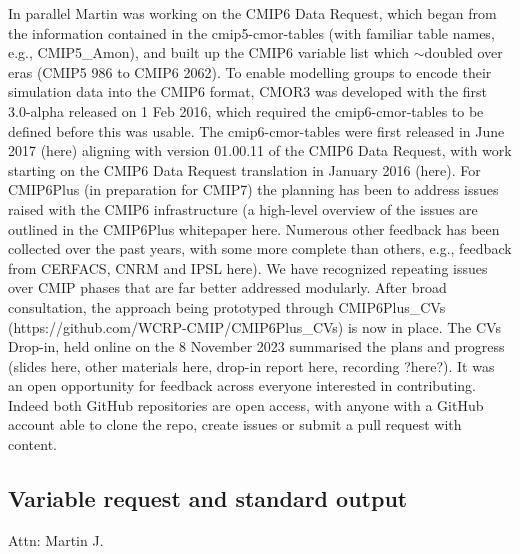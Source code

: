 \documentclass[gmd, preprint]{copernicus}
\newcommand{\mycomment}[1]{}
\def\cred#1{{\color{red}#1}}
\begin{document}
{In parallel Martin was working on the CMIP6 Data Request, which began from the information contained in the cmip5-cmor-tables (with familiar table names, e.g., CMIP5_Amon), and built up the CMIP6 variable list which $\sim$doubled over eras (CMIP5 986 to CMIP6 2062). To enable modelling groups to encode their simulation data into the CMIP6 format, CMOR3 was developed with the first 3.0-alpha released on 1 Feb 2016, which required the cmip6-cmor-tables to be defined before this was usable. The cmip6-cmor-tables were first released in June 2017 (here) aligning with version 01.00.11 of the CMIP6 Data Request, with work starting on the CMIP6 Data Request translation in January 2016 (here).
For CMIP6Plus (in preparation for CMIP7) the planning has been to address issues raised with the CMIP6 infrastructure (a high-level overview of the issues are outlined in the CMIP6Plus whitepaper here. Numerous other feedback has been collected over the past years, with some more complete than others, e.g., feedback from CERFACS, CNRM and IPSL here). We have recognized repeating issues over CMIP phases that are far better addressed modularly. After broad consultation, the approach being prototyped through CMIP6Plus_CVs (https://github.com/WCRP-CMIP/CMIP6Plus_CVs) is now in place. The CVs Drop-in, held online on the 8 November 2023 summarised the plans and progress (slides here, other materials here, drop-in report here, recording ?here?). It was an open opportunity for feedback across everyone interested in contributing. Indeed both GitHub repositories are open access, with anyone with a GitHub account able to clone the repo, create issues or submit a pull request with content.
}


\subsection{Variable request and standard output}
\label{sec:CMIP6DR}
\cred{Attn: Martin J.}
\mycomment{Consider realm/frequency evolution across mip eras. RE: realm evolution, started in CMIP3 with tables (A1, O1, etc), built around the history files, from model components - so all ocean history files contained ocean, and sea ice variable, etc - Karl to augment; RE: frequencies, 3D fields, vs 2D fields were separated across tables as these had different temporal requests, to keep request sizes down; \autoref{tab:tab1-MIPsThroughTime} and \autoref{tab:tabAppB1-MIPStandardOutput}

Old: A critical component MIP experimentation is specifying what simulation output to save. It is a trade-off between the efforts required by modelling groups to fulfill a request, available storage, and existing and potential future science needs. Despite advancing technology, saving everything (i.e., all prognostic variables at every timestep) has never been realistic. In AMIP1/2, CMIP1/2/2+/3/5, consideration was made in consultation with MIP chairs and modelling groups about what questions or analyses will be pursued with a given simulation that dictates how much data is saved.

As MIPs emerged, more scientists began analyzing simulations, and it was not always clear a priori what would be studied.
}
\end{document}
